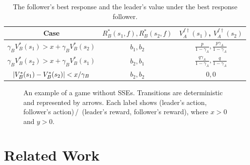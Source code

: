 \documentclass{acml}
\DeclarePairedDelimiter{\abs}{\lvert}{\rvert}
\begin{document}
\begin{table}[t]
\centering
\caption{The follower's best response and the leader's value under the best response follower.}\label{tbl:sevalues}
\begin{tabular}{ccc}
    \toprule
    Case & $R_B^*(s_1,f), R_B^*(s_2,f)$ & $ V_A^{f\dag}(s_1)$,  $V_A^{f\dag}(s_2)$\\
    \midrule
    $\gamma_B V_B^*(s_1) > x + \gamma_B V_B^*(s_2)$ & $b_1, b_2$ & $\frac{p}{1 - \gamma_A}, \frac{p \gamma_A}{1 - \gamma_A}$ \\
    $\gamma_B V_B^*(s_2) > x + \gamma_B V_B^*(s_1)$ & $b_2, b_1$ & $\frac{q \gamma_A}{1 - \gamma_A}, \frac{q}{1 - \gamma_A}$ \\
    $\abs{ V_B^*(s_1) - V_B^*(s_2)} < x / \gamma_B$ & $b_2, b_2$ & $0, 0$ \\
     \bottomrule
\end{tabular}
\end{table}
\begin{figure}[t]
  \centering
  \caption{An example of a game without SSEs. 
  Transitions are deterministic and represented by arrows. 
  Each label shows (leader's action, follower's action)\,/\, (leader's reward, follower's reward), where $x > 0$ and $y > 0$.}
  \label{fig:toytask}
\end{figure}






\section{Related Work}\label{sec:related_works}
\end{document}
